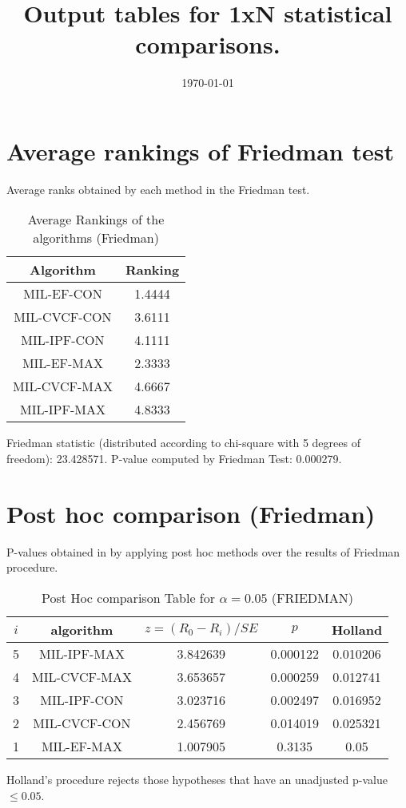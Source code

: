 \documentclass[a4paper,10pt]{article}
\title{Output tables for 1xN statistical comparisons.}
\author{}
\date{\today}
\begin{document}
\begin{landscape}
\pagestyle{empty}
\maketitle
\thispagestyle{empty}

\section{Average rankings of Friedman test}


Average ranks obtained by each method in the Friedman test.

\begin{table}[!htp]
\centering
\begin{tabular}{|c|c|}\hline
Algorithm&Ranking\\\hline
MIL-EF-CON&1.4444\\MIL-CVCF-CON&3.6111\\MIL-IPF-CON&4.1111\\MIL-EF-MAX&2.3333\\MIL-CVCF-MAX&4.6667\\MIL-IPF-MAX&4.8333\\\hline\end{tabular}
\caption{Average Rankings of the algorithms (Friedman)}
\end{table}

Friedman statistic (distributed according to chi-square with 5 degrees of freedom): 23.428571. \newline P-value computed by Friedman Test: 0.000279.\newline


\newpage

\section{Post hoc comparison (Friedman)}


P-values obtained in by applying post hoc methods over the results of Friedman procedure.

\begin{table}[!htp]
\centering\footnotesize
\begin{tabular}{ccccc}
$i$&algorithm&$z=(R_0 - R_i)/SE$&$p$&Holland\\
\hline5&MIL-IPF-MAX&3.842639&0.000122&0.010206\\4&MIL-CVCF-MAX&3.653657&0.000259&0.012741\\3&MIL-IPF-CON&3.023716&0.002497&0.016952\\2&MIL-CVCF-CON&2.456769&0.014019&0.025321\\1&MIL-EF-MAX&1.007905&0.3135&0.05\\\hline
\end{tabular}
\caption{Post Hoc comparison Table for $\alpha=0.05$ (FRIEDMAN)}
\end{table}Holland's procedure rejects those hypotheses that have an unadjusted p-value $\le0.05$.



\end{landscape}
\end{document}
